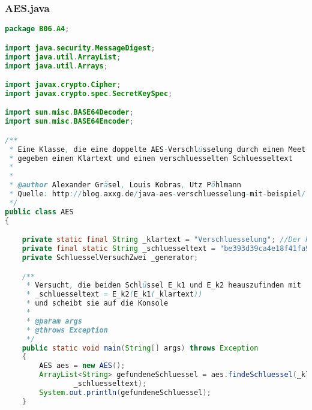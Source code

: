\documentclass[twoside]{article}
\begin{document}
		\subsubsection*{AES.java}
		\begin{lstlisting}[language=Java]
package B06.A4;

import java.security.MessageDigest;
import java.util.ArrayList;
import java.util.Arrays;

import javax.crypto.Cipher;
import javax.crypto.spec.SecretKeySpec;

import sun.misc.BASE64Decoder;
import sun.misc.BASE64Encoder;

/**
 * Eine Klasse, die eine doppelte AES-Verschlüsselung durch einen Meet-In-The-Middle-Angriff knackt
 * gegeben einen Klartext und einen verschluesselten Schluesseltext
 * 
 * 
 * @author Alexander Gräsel, Louis Kobras, Utz Pöhlmann
 * Quelle: http://blog.axxg.de/java-aes-verschluesselung-mit-beispiel/
 */
public class AES
{

    private static final String _klartext = "Verschluesselung"; //Der Klartext
    private final static String _schluesseltext = "be393d39ca4e18f41fa9d88a9d47a574"; //Der doppelt verschlüsselte Klartext
    private SchluesselVersuchZwei _generator;

    /**
     * Versucht, die beiden Schlüssel E_k1 und E_k2 heauszufinden mit
     * _schluesseltext = E_k2(E_k1(_klartext))
     * und scheibt sie auf die Konsole
     * 
     * @param args
     * @throws Exception
     */
    public static void main(String[] args) throws Exception
    {
        AES aes = new AES();
        ArrayList<String> gefundeneSchluessel = aes.findeSchluessel(_klartext,
                _schluesseltext);
        System.out.println(gefundeneSchluessel);
    }


\end{lstlisting}
\end{document}
